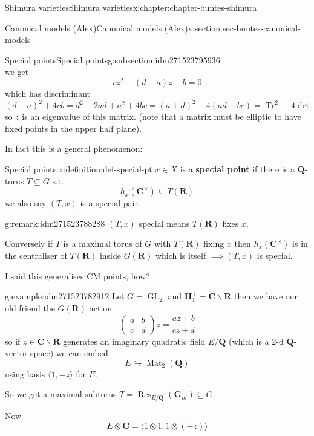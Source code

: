 \documentclass[oneside,10pt,]{book}
\newcommand{\terminology}[1]{\textbf{#1}}
\numberwithin{equation}{section}
\newcommand{\QQ}{\mathbf{Q}}
\newcommand{\RR}{\mathbf{R}}
\newcommand{\CC}{\mathbf{C}}
\DeclareMathOperator{\Res}{Res}
\DeclareMathOperator{\trace}{Tr}
\DeclareMathOperator{\Mat}{Mat}
\DeclareMathOperator{\GL}{GL}
\newcommand{\amp}{&}
\begin{document}
\begin{chapterptx}{Shimura varieties}{}{Shimura varieties}{}{}{x:chapter:chapter-buntes-shimura}
\begin{sectionptx}{Canonical models (Alex)}{}{Canonical models (Alex)}{}{}{x:section:sec-buntes-canonical-models}
\begin{subsectionptx}{Special points}{}{Special points}{}{}{g:subsection:idm271523795936}
\begin{equation*}
\end{equation*}
we get%
\begin{equation*}
cz^2 + (d - a) z - b = 0
\end{equation*}
which has discriminant \((d-a)^2 + 4cb = d^2 - 2ad + a^2 + 4bc =  (a+d)^2 - 4(ad - bc) = \trace^2 - 4\det\) so \(z\) is an eigenvalue of this matrix. (note that a matrix must be elliptic to have fixed points in the upper half plane).%
\par
In fact this is a general phenomenon:%
\begin{definition}{Special points.}{x:definition:def-special-pt}%
\(x \in X\) is a \terminology{special point} if there is a \(\QQ\)-torus \(T \subseteq G\) s.t.%
\begin{equation*}
h_x(\CC^\times) \subseteq T(\RR)
\end{equation*}
we also say \((T,x)\) is a special pair.%
\end{definition}
\begin{remark}{}{g:remark:idm271523788288}%
\((T,x)\) special means \(T(\RR)\) fixes \(x\).%
\par
Conversely if \(T\) is a maximal torus of \(G\) with \(T(\RR)\) fixing \(x\) then \(h_x(\CC^\times)\) is in the centraliser of \(T(\RR)\) inside \(G(\RR)\) which is itself \(\implies (T,x)\) is special.%
\end{remark}
I said this generalises CM points, how?%
\begin{example}{}{g:example:idm271523782912}%
Let \(G = \GL_2\) and \(\mathbf H_1^\pm = \CC \smallsetminus \RR\) then we have our old friend the \(G(\RR)\) action%
\begin{equation*}
\begin{pmatrix} a\amp b \\ c \amp d\end{pmatrix} z = \frac{az + b}{cz+d}
\end{equation*}
so if \(z \in \CC \smallsetminus \RR\) generates an imaginary quadratic field \(E/\QQ\) (which is a 2-d \(\QQ\)-vector space) we can embed%
\begin{equation*}
E \hookrightarrow \Mat_2(\QQ)
\end{equation*}
using basis \(\langle 1, -z\rangle\) for \(E\).%
\par
So we get a maximal subtorus \(T = \Res_{E/\QQ}(\mathbf G_m) \subseteq G\).%
\par
Now%
\begin{equation*}
E\otimes \CC = \langle 1\otimes 1, 1 \otimes (-z)\rangle
\end{equation*}

\end{example}
\end{subsectionptx}
\end{sectionptx}
\end{chapterptx}
\end{document}
